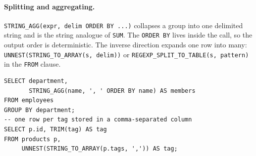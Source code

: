 \newpage

\paragraph{Splitting and aggregating.} \texttt{STRING\_AGG(expr, delim ORDER BY
...)} collapses a group into one delimited string and is the string analogue of
\texttt{SUM}. The \texttt{ORDER BY} lives inside the call, so the output order
is deterministic. The inverse direction expands one row into many:
\texttt{UNNEST(STRING\_TO\_ARRAY(s, delim))} or
\texttt{REGEXP\_SPLIT\_TO\_TABLE(s, pattern)} in the \texttt{FROM} clause.

\begin{lstlisting}[style=sql, caption={Collapse a group, then expand it back}]
SELECT department,
       STRING_AGG(name, ', ' ORDER BY name) AS members
FROM employees
GROUP BY department;
-- one row per tag stored in a comma-separated column
SELECT p.id, TRIM(tag) AS tag
FROM products p,
     UNNEST(STRING_TO_ARRAY(p.tags, ',')) AS tag;
\end{lstlisting}
